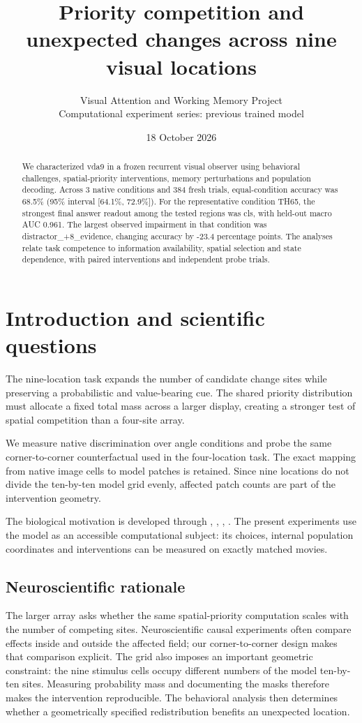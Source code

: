 \documentclass[11pt]{article}
\begin{document}
\title{\color{ink}Priority competition and unexpected changes across nine visual locations}
\author{Visual Attention and Working Memory Project\\Computational experiment series: previous trained model}\date{18 October 2026}\maketitle
\begin{abstract}
We characterized vda9 in a frozen recurrent visual observer using behavioral challenges, spatial-priority interventions, memory perturbations and population decoding. Across 3 native conditions and 384 fresh trials, equal-condition accuracy was 68.5\% (95\% interval [64.1\%, 72.9\%]). For the representative condition TH65, the strongest final answer readout among the tested regions was cls, with held-out macro AUC 0.961. The largest observed impairment in that condition was distractor\_\allowbreak{}+8\_\allowbreak{}evidence, changing accuracy by -23.4 percentage points. The analyses relate task competence to information availability, spatial selection and state dependence, with paired interventions and independent probe trials.
\end{abstract}
\section{Introduction and scientific questions}
The nine-location task expands the number of candidate change sites while preserving a probabilistic and value-bearing cue. The shared priority distribution must allocate a fixed total mass across a larger display, creating a stronger test of spatial competition than a four-site array.

We measure native discrimination over angle conditions and probe the same corner-to-corner counterfactual used in the four-location task. The exact mapping from native image cells to model patches is retained. Since nine locations do not divide the ten-by-ten model grid evenly, affected patch counts are part of the intervention geometry.

The biological motivation is developed through \cite{rvit}, \cite{sc}, \cite{normalization}, \cite{wolfe}. The present experiments use the model as an accessible computational subject: its choices, internal population coordinates and interventions can be measured on exactly matched movies.

\subsection{Neuroscientific rationale}
The larger array asks whether the same spatial-priority computation scales with the number of competing sites. Neuroscientific causal experiments often compare effects inside and outside the affected field; our corner-to-corner design makes that comparison explicit. The grid also imposes an important geometric constraint: the nine stimulus cells occupy different numbers of the model ten-by-ten sites. Measuring probability mass and documenting the masks therefore makes the intervention reproducible. The behavioral analysis then determines whether a geometrically specified redistribution benefits an unexpected location.
\end{document}
